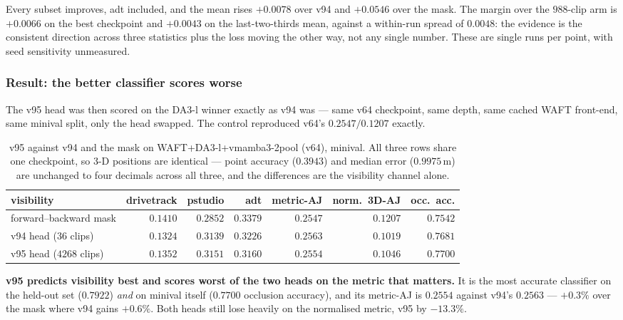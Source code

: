 \documentclass[11pt,a4paper]{article}
\begin{document}
Every subset improves, adt included, and the mean rises $+0.0078$ over v94 and $+0.0546$ over the
mask. The margin over the $988$-clip arm is $+0.0066$ on the best checkpoint and $+0.0043$ on the
last-two-thirds mean, against a within-run spread of $0.0048$: the evidence is the consistent
direction across three statistics plus the loss moving the other way, not any single number.
These are single runs per point, with seed sensitivity unmeasured.

\subsubsection{Result: the better classifier scores worse}
The v95 head was then scored on the DA3-l winner exactly as v94 was --- same v64 checkpoint, same
depth, same cached WAFT front-end, same minival split, only the head swapped. The control
reproduced v64's $0.2547 / 0.1207$ exactly.

\begin{table}[h]
\centering
\caption{v95 against v94 and the mask on \mbox{WAFT+DA3-l+vmamba3-2pool} (v64), minival. All
three rows share one checkpoint, so 3-D positions are identical --- point accuracy
($0.3943$) and median error ($0.9975$\,m) are unchanged to four decimals across all three, and
the differences are the visibility channel alone.}
\label{tab:v95-result}
\setlength{\tabcolsep}{4.5pt}
\begin{tabular}{lrrrrrr}
\toprule
visibility & drivetrack & pstudio & adt & metric-AJ & norm.\ 3D-AJ & occ.\ acc. \\
\midrule
forward--backward mask & $\mathbf{0.1410}$ & $0.2852$ & $\mathbf{0.3379}$ & $0.2547$ & $\mathbf{0.1207}$ & $0.7542$ \\
v94 head ($36$ clips)  & $0.1324$ & $0.3139$ & $0.3226$ & $\mathbf{0.2563}$ & $0.1019$ & $0.7681$ \\
v95 head ($4268$ clips) & $0.1352$ & $\mathbf{0.3151}$ & $0.3160$ & $0.2554$ & $0.1046$ & $\mathbf{0.7700}$ \\
\bottomrule
\end{tabular}
\end{table}

\textbf{v95 predicts visibility best and scores worst of the two heads on the metric that
matters.} It is the most accurate classifier on the held-out set ($0.7922$) \emph{and} on minival
itself ($0.7700$ occlusion accuracy), and its metric-AJ is $0.2554$ against v94's $0.2563$ ---
$+0.3\%$ over the mask where v94 gains $+0.6\%$. Both heads still lose heavily on the normalised
metric, v95 by $-13.3\%$.
\end{document}
